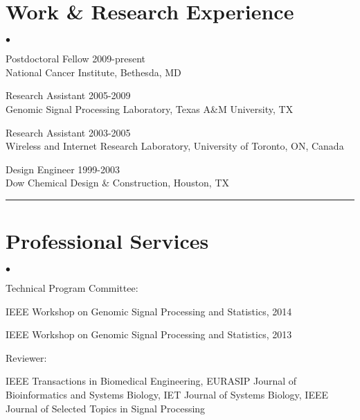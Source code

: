 \documentclass[12pt, centered, centered]{res_yy}
\newenvironment{list1}{
  \begin{list}{\ding{113}}{%
      \setlength{\itemsep}{0in}
      \setlength{\parsep}{0in} \setlength{\parskip}{0in}
      \setlength{\topsep}{0in} \setlength{\partopsep}{0in} 
      \setlength{\leftmargin}{0.17in}}}{\end{list}}
\newenvironment{list2}{
  \begin{list}{$\bullet$}{%
      \setlength{\itemsep}{0in}
      \setlength{\parsep}{0in} \setlength{\parskip}{0in}
      \setlength{\topsep}{0in} \setlength{\partopsep}{0in} 
      \setlength{\leftmargin}{0.2in}}}{\end{list}}
\begin{document}
\begin{resume}
\section{\sc Work \& Research Experience}
\vspace{0.2in}
\begin{list2}
\item[] Postdoctoral Fellow \hfill 2009-present \\
National Cancer Institute, Bethesda, MD
\vspace{0.1in}
\item[] Research Assistant \hfill 2005-2009 \\
Genomic Signal Processing Laboratory, Texas A\&M University, TX
\vspace{0.1in}
\item[] Research Assistant \hfill 2003-2005\\
Wireless and Internet Research Laboratory, University of Toronto, ON, Canada
\vspace{0.1in}
\item[] Design Engineer \hfill 1999-2003\\
Dow Chemical Design \& Construction, Houston, TX
\end{list2}
\vspace{-.1in}
\rule{\linewidth}{0.05mm}


\section{\sc Professional Services} 
\vspace{.2in}
\begin{list2}
\item Technical Program Committee:
\begin{list1}
\item[] IEEE Workshop on Genomic Signal Processing and Statistics, 2014
\item[] IEEE Workshop on Genomic Signal Processing and Statistics, 2013
\end{list1}
\item Reviewer:
\begin{list1}
\item[] IEEE Transactions in Biomedical Engineering, EURASIP Journal of Bioinformatics and Systems Biology, IET Journal of Systems Biology, IEEE Journal of Selected Topics in Signal Processing
\end{list1}
\end{list2}


\end{resume}
\end{document}
